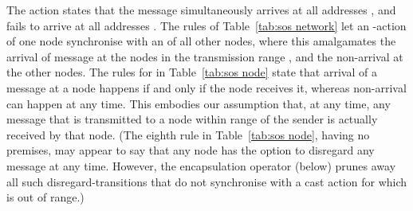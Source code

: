 \documentclass[envcountsame,envcountsect,orivec,runningheads]{llncs}
\begin{document}
The action  states that the message
 simultaneously arrives at all addresses ,
and fails to arrive at all addresses .  The
rules of Table~\ref{tab:sos network} let an
-action of one node synchronise with an
 of all other nodes, where this  amalgamates
the arrival of message  at the nodes in the transmission range ,
and the non-arrival at the
other nodes. The rules for  in Table~\ref{tab:sos node}
state that arrival of a message at a node happens if and only if the
node receives it, whereas non-arrival can happen at any time.
This embodies our assumption that, at any time, any message that is
transmitted to a node within range of the sender is actually received
by that node.
(The eighth rule in Table~\ref{tab:sos node}, having no
  premises, may appear to say that any node  has the option to
  disregard any message at any time. However, the encapsulation
  operator (below) prunes away all such disregard-transitions that do
  not synchronise with a cast action for which  is out of range.)
\end{document}
